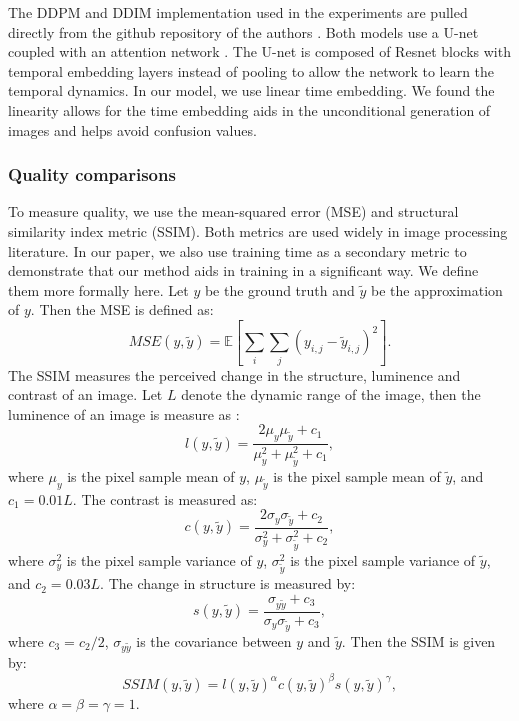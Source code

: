 \documentclass[]{interact}
\theoremstyle{plain}%
\theoremstyle{definition}
\theoremstyle{remark}
\begin{document}
The DDPM and DDIM implementation used in the experiments are pulled directly from the github repository of the authors \cite{jsong-2020, ysong-2020}. Both models use a U-net \cite{ronneberger-2015} coupled with an attention network \cite{vaswani-2017}. The U-net is composed of Resnet blocks with temporal embedding layers instead of pooling to allow the network to learn the temporal dynamics. In our model, we use linear time embedding. We found the linearity allows for the time embedding aids in the unconditional generation of images and helps avoid confusion values.

\subsubsection*{Quality comparisons}
To measure quality, we use the mean-squared error (MSE) and structural similarity index metric (SSIM). Both metrics are used widely in image processing literature. In our paper, we also use training time as a secondary metric to demonstrate that our method aids in training in a significant way.  We define them more formally here. Let $y$ be the ground truth and $\tilde{y}$ be the approximation of $y$. Then the MSE is defined as:
\begin{equation}
    MSE(y,\tilde{y}) = \mathbb{E}[\sum_{i}\sum_{j} (y_{i,j} - \tilde{y}_{i,j})^2].
\end{equation}
The SSIM measures the perceived change in the structure, luminence and contrast of an image. Let $L$ denote the dynamic range of the image, then the luminence of an image is measure as \cite{Wang-2004}:
\begin{equation}
    l(y,\tilde{y}) = \frac{2\mu_y\mu_{\tilde{y}} + c_1}{\mu_y^2 + \mu_{\tilde{y}}^2 + c_1},
\end{equation}
where $\mu_y$ is the pixel sample mean of $y$, $\mu_{\tilde{y}}$ is the pixel sample mean of $\tilde{y}$, and $c_1 = 0.01 L$. The contrast is measured as:
\begin{equation}
    c(y,\tilde{y}) = \frac{2\sigma_y\sigma_{\tilde{y}} + c_2}{\sigma_y^2 + \sigma_{\tilde{y}}^2 + c_2},
\end{equation}
where $\sigma_{y}^2$ is the pixel sample variance of $y$, $\sigma_{\tilde{y}}^2$ is the pixel sample variance of $\tilde{y}$, and  $c_2 = 0.03L$. The change in structure is measured by:
\begin{equation}
    s(y,\tilde{y}) = \frac{\sigma_{y\tilde{y}} + c_3}{\sigma_y\sigma_{\tilde{y}} + c_3},
\end{equation}
where $c_3 =c_2/2$, $\sigma_{y\tilde{y}}$ is the covariance between $y$ and $\tilde{y}$. Then the SSIM is given by:
\begin{equation}
    SSIM(y,\tilde{y}) = l(y,\tilde{y})^\alpha c(y,\tilde{y})^\beta s(y,\tilde{y})^\gamma,
\end{equation}
where $\alpha = \beta = \gamma = 1$.
\end{document}
